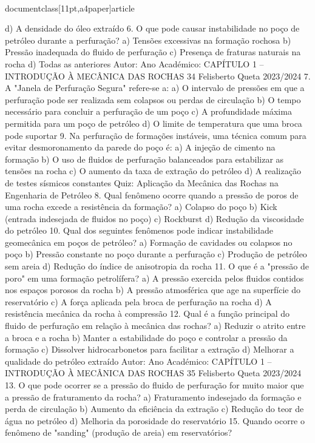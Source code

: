 \\documentclass[11pt,a4paper]{article}
\begin{document}
d) A densidade do óleo extraído
6. O que pode causar instabilidade no poço de petróleo durante a perfuração?
a) Tensões excessivas na formação rochosa
b) Pressão inadequada do fluido de perfuração
c) Presença de fraturas naturais na rocha
d) Todas as anteriores
Autor:
Ano Académico:
CAPÍTULO 1 – INTRODUÇÃO À MECÂNICA DAS ROCHAS 34
Felisberto Queta
2023/2024
7. A "Janela de Perfuração Segura" refere-se a:
a) O intervalo de pressões em que a perfuração pode ser realizada sem colapsos ou perdas de circulação
b) O tempo necessário para concluir a perfuração de um poço
c) A profundidade máxima permitida para um poço de petróleo
d) O limite de temperatura que uma broca pode suportar
9. Na perfuração de formações instáveis, uma técnica comum para evitar desmoronamento da parede do poço é:
a) A injeção de cimento na formação
b) O uso de fluidos de perfuração balanceados para estabilizar as tensões na rocha
c) O aumento da taxa de extração do petróleo
d) A realização de testes sísmicos constantes
Quiz: Aplicação da 
Mecânica das 
Rochas na 
Engenharia de 
Petróleo
8. Qual fenômeno ocorre quando a pressão de poros de uma rocha excede a resistência da formação?
a) Colapso do poço
b) Kick (entrada indesejada de fluidos no poço)
c) Rockburst
d) Redução da viscosidade do petróleo
10. Qual dos seguintes fenômenos pode indicar instabilidade geomecânica em poços de petróleo?
a) Formação de cavidades ou colapsos no poço
b) Pressão constante no poço durante a perfuração
c) Produção de petróleo sem areia
d) Redução do índice de anisotropia da rocha
11. O que é a "pressão de poro" em uma formação petrolífera?
a) A pressão exercida pelos fluidos contidos nos espaços porosos da rocha
b) A pressão atmosférica que age na superfície do reservatório
c) A força aplicada pela broca de perfuração na rocha
d) A resistência mecânica da rocha à compressão
12. Qual é a função principal do fluido de perfuração em relação à mecânica das rochas?
a) Reduzir o atrito entre a broca e a rocha
b) Manter a estabilidade do poço e controlar a pressão da formação
c) Dissolver hidrocarbonetos para facilitar a extração
d) Melhorar a qualidade do petróleo extraído
Autor:
Ano Académico:
CAPÍTULO 1 – INTRODUÇÃO À MECÂNICA DAS ROCHAS 35
Felisberto Queta
2023/2024
13. O que pode ocorrer se a pressão do fluido de perfuração for muito maior que a pressão de fraturamento da 
rocha?
a) Fraturamento indesejado da formação e perda de circulação
b) Aumento da eficiência da extração
c) Redução do teor de água no petróleo
d) Melhoria da porosidade do reservatório
15. Quando ocorre o fenômeno de "sanding" (produção de areia) em reservatórios?
\end{document}
